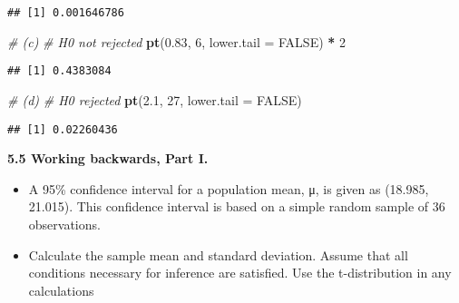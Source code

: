 \documentclass[]{book}
\newenvironment{Shaded}{\begin{snugshade}}{\end{snugshade}}
\newcommand{\CommentTok}[1]{\textcolor[rgb]{0.56,0.35,0.01}{\textit{#1}}}
\newcommand{\DataTypeTok}[1]{\textcolor[rgb]{0.13,0.29,0.53}{#1}}
\newcommand{\DecValTok}[1]{\textcolor[rgb]{0.00,0.00,0.81}{#1}}
\newcommand{\FloatTok}[1]{\textcolor[rgb]{0.00,0.00,0.81}{#1}}
\newcommand{\KeywordTok}[1]{\textcolor[rgb]{0.13,0.29,0.53}{\textbf{#1}}}
\newcommand{\NormalTok}[1]{#1}
\newcommand{\OperatorTok}[1]{\textcolor[rgb]{0.81,0.36,0.00}{\textbf{#1}}}
\newcommand{\OtherTok}[1]{\textcolor[rgb]{0.56,0.35,0.01}{#1}}
\newcommand{\StringTok}[1]{\textcolor[rgb]{0.31,0.60,0.02}{#1}}
\providecommand{\tightlist}{%
  \setlength{\itemsep}{0pt}\setlength{\parskip}{0pt}}
\begin{document}
\begin{verbatim}
## [1] 0.001646786
\end{verbatim}

\begin{Shaded}
\begin{Highlighting}[]
\CommentTok{# (c)}
\CommentTok{# H0 not rejected}
\KeywordTok{pt}\NormalTok{(}\FloatTok{0.83}\NormalTok{, }\DecValTok{6}\NormalTok{, }\DataTypeTok{lower.tail =} \OtherTok{FALSE}\NormalTok{) }\OperatorTok{*}\StringTok{ }\DecValTok{2}
\end{Highlighting}
\end{Shaded}

\begin{verbatim}
## [1] 0.4383084
\end{verbatim}

\begin{Shaded}
\begin{Highlighting}[]
\CommentTok{# (d)}
\CommentTok{# H0 rejected}
\KeywordTok{pt}\NormalTok{(}\FloatTok{2.1}\NormalTok{, }\DecValTok{27}\NormalTok{, }\DataTypeTok{lower.tail =} \OtherTok{FALSE}\NormalTok{)}
\end{Highlighting}
\end{Shaded}

\begin{verbatim}
## [1] 0.02260436
\end{verbatim}

\textbf{5.5 Working backwards, Part I.}

\begin{itemize}
\tightlist
\item
  A 95\% confidence interval for a population mean, μ, is given as (18.985, 21.015). This confidence interval is based on a simple random sample of 36 observations.
\item
  Calculate the sample mean and standard deviation. Assume that all conditions necessary for inference are satisfied. Use the t-distribution in any calculations
\end{itemize}
\end{document}
